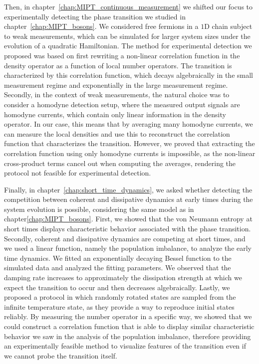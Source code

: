 Then, in chapter~\ref{chap:MIPT_continuous_measurement} we shifted our focus to experimentally detecting the phase transition we studied in chapter~\ref{chap:MIPT_bosons}. We considered free fermions in a $1$D chain subject to weak measurements, which can be simulated for larger system sizes under the evolution of a quadratic Hamiltonian. The method for experimental detection we proposed was based on first rewriting a non-linear correlation function in the density operator as a function of local number operators. The transition is characterized by this correlation function, which decays algebraically in the small measurement regime and exponentially in the large measurement regime. Secondly, in the context of weak measurements, the natural choice was to consider a homodyne detection setup, where the measured output signals are homodyne currents, which contain only linear information in the density operator. In our case, this means that by averaging many homodyne currents, we can measure the local densities and use this to reconstruct the correlation function that characterizes the transition. However, we proved that extracting the correlation function using only homodyne currents is impossible, as the non-linear cross-product terms cancel out when computing the averages, rendering the protocol not feasible for experimental detection.

Finally, in chapter~\ref{chap:short_time_dynamics}, we asked whether detecting the competition between coherent and dissipative dynamics at early times during the system evolution is possible, considering the same model as in chapter\ref{chap:MIPT_bosons}. First, we showed that the von Neumann entropy at short times displays characteristic behavior associated with the phase transition. Secondly, coherent and dissipative dynamics are competing at short times, and we used a linear function, namely the population imbalance, to analyze the early time dynamics. We fitted an exponentially decaying Bessel function to the simulated data and analyzed the fitting parameters. We observed that the damping rate increases to approximately the dissipation strength at which we expect the transition to occur and then decreases algebraically. Lastly, we proposed a protocol in which randomly rotated states are sampled from the infinite temperature state, as they provide a way to reproduce initial states reliably. By measuring the number operator in a specific way, we showed that we could construct a correlation function that is able to display similar characteristic behavior we saw in the analysis of the population imbalance, therefore providing an experimentally feasible method to visualize features of the transition even if we cannot probe the transition itself. 

